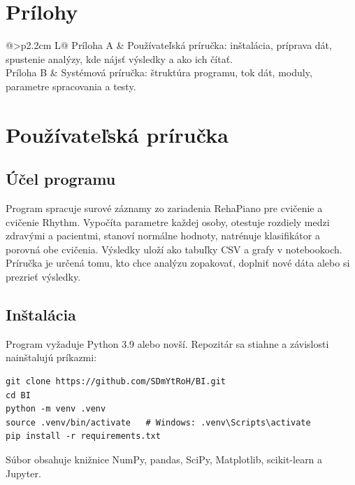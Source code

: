 \documentclass[12pt,a4paper]{article}
\begin{document}
\clearpage
\section*{Prílohy}

\begin{tabularx}{\textwidth}{@{}>{\bfseries}p{2.2cm} L@{}}
Príloha A & Používateľská príručka: inštalácia, príprava dát, spustenie analýzy, kde nájsť výsledky a ako ich čítať. \\
Príloha B & Systémová príručka: štruktúra programu, tok dát, moduly, parametre spracovania a testy. \\
\end{tabularx}

\clearpage
{}
\setcounter{section}{0}
\renewcommand{\thesection}{\Alph{section}}
\renewcommand{\thesubsection}{\thesection.\arabic{subsection}}
\titleformat{\section}{\Large\bfseries}{Príloha \thesection:}{0.5em}{}
\section{Používateľská príručka}
\label{pril:a}

\subsection{Účel programu}

Program spracuje surové záznamy zo zariadenia RehaPiano pre cvičenie \ef{} a cvičenie Rhythm. Vypočíta parametre každej
osoby, otestuje rozdiely medzi zdravými a pacientmi, stanoví normálne hodnoty, natrénuje klasifikátor a porovná obe
cvičenia. Výsledky uloží ako tabuľky CSV a grafy v notebookoch. Príručka je určená tomu, kto chce analýzu zopakovať,
doplniť nové dáta alebo si prezrieť výsledky.

\subsection{Inštalácia}

Program vyžaduje Python 3.9 alebo novší. Repozitár sa stiahne a závislosti nainštalujú príkazmi:
\begin{verbatim}
git clone https://github.com/SDmYtRoH/BI.git
cd BI
python -m venv .venv
source .venv/bin/activate   # Windows: .venv\Scripts\activate
pip install -r requirements.txt
\end{verbatim}
Súbor  obsahuje knižnice NumPy, pandas, SciPy, Matplotlib, scikit-learn a Jupyter.
\end{document}
